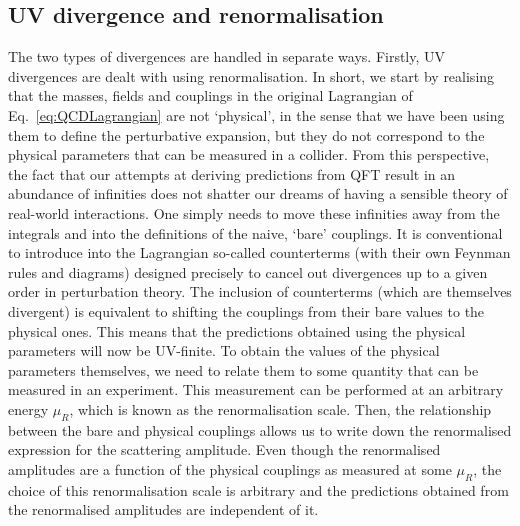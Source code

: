 \documentclass[main.tex]{subfiles}
\begin{document}
\subsection{UV divergence and renormalisation}
The two types of divergences are handled in separate ways. Firstly, UV divergences are dealt with using renormalisation. In short, we start by realising that the masses, fields and couplings in the original Lagrangian of Eq.~\ref{eq:QCDLagrangian} are not `physical', in the sense that we have been using them to define the perturbative expansion, but they do not correspond to the physical parameters that can be measured in a collider. From this perspective, the fact that our attempts at deriving predictions from QFT result in an abundance of infinities does not shatter our dreams of having a sensible theory of real-world interactions. One simply needs to move these infinities away from the integrals and into the definitions of the naive, `bare' couplings. It is conventional to introduce into the Lagrangian so-called counterterms (with their own Feynman rules and diagrams) designed precisely to cancel out divergences up to a given order in perturbation theory. The inclusion of counterterms (which are themselves divergent) is equivalent to shifting the couplings from their bare values to the physical ones. This means that the predictions obtained using the physical parameters will now be UV-finite. To obtain the values of the physical parameters themselves, we need to relate them to some quantity that can be measured in an experiment. This measurement can be performed at an arbitrary energy $\mu_R$, which is known as the renormalisation scale. Then, the relationship between the bare and physical couplings allows us to write down the renormalised expression for the scattering amplitude. Even though the renormalised amplitudes are a function of the physical couplings as measured at some $\mu_R$, the choice of this renormalisation scale is arbitrary and the predictions obtained from the renormalised amplitudes are independent of it.
\end{document}

